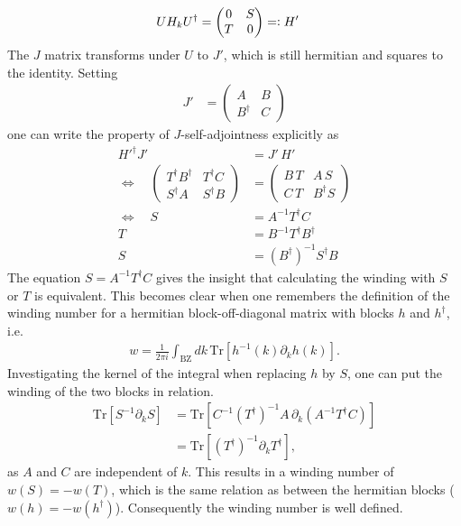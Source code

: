 \begin{align*}
    U H_k U^\dagger &= \begin{pmatrix}
        0 & S\\
        T & 0
    \end{pmatrix}=\vcentcolon H'
\end{align*}
The $J$ matrix transforms under $U$ to $J'$, which is still hermitian and squares to the identity. Setting 
\begin{align*}
    J'&= \begin{pmatrix}
        A & B\\
        B^\dagger & C
    \end{pmatrix}
\end{align*}
one can write the property of $J$-self-adjointness explicitly as
\begin{align*}
    H'^\dagger J' &= J'\,H'\\
    \Leftrightarrow \quad \begin{pmatrix}
        T^\dagger B^\dagger & T^\dagger C\\
        S^\dagger A & S^\dagger B
    \end{pmatrix}&= \begin{pmatrix}
        B\,T & A\,S\\
        C\,T & B^\dagger S
    \end{pmatrix}\\
    \Leftrightarrow\quad S &= A^{-1}T^\dagger C \\
    T &= B^{-1}T^\dagger B^\dagger\\
    S &= (B^\dagger)^{-1} S^\dagger B
\end{align*}
The equation $S = A^{-1}T^\dagger C$ gives the insight that calculating the winding with $S$ or $T$ is equivalent. This becomes clear when one remembers the definition of the winding number for a hermitian block-off-diagonal matrix with blocks $h$ and $h^\dagger$, i.e. 
\begin{align*}
    w = \frac{1}{2\pi i} \int_\text{BZ} dk \,\text{Tr}\left[h^{-1}(k) \partial_kh(k)\right].
\end{align*}
Investigating the kernel of the integral when replacing $h$ by $S$, one can put the winding of the two blocks in relation.
\begin{align*}
    \text{Tr}\left[ S^{-1}\partial_k S  \right]&= \text{Tr}\left[ C^{-1}(T^\dagger)^{-1}A\,\partial_k \left( A^{-1}T^\dagger C \right)  \right]\\
    &=  \text{Tr}\left[ (T^\dagger)^{-1}\partial_k T^\dagger  \right],
\end{align*}
as $A$ and $C$ are independent of $k$. This results in a winding number of $w(S)=-w(T)$, which is the same relation as between the hermitian blocks ($w(h)=-w(h^\dagger)$). Consequently the winding number is well defined. 